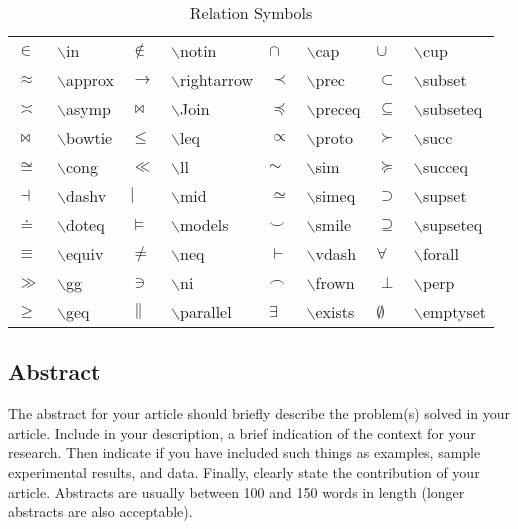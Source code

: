 \documentclass{llncs}
\begin{document}
\vspace{-10mm}

\begin{table}
\begin{center}
\caption{\label{relation}Relation Symbols}
\renewcommand{\arraystretch}{0.5}
\setlength\tabcolsep{3pt}
\begin{tabular}{llllllll}
\hline\noalign{\smallskip}
$\in$ & $\backslash$in & $\notin$ & $\backslash$notin & $\cap$ & $\backslash$cap & $\cup$ & $\backslash$cup\\
$\approx$ & $\backslash$approx & $\rightarrow$ & $\backslash$rightarrow & $\prec$ & $\backslash$prec & $\subset$& $\backslash$subset\\
$\asymp$ & $\backslash$asymp & $\Join$ & $\backslash$Join & $\preceq$ & $\backslash$preceq & $\subseteq$& $\backslash$subseteq\\
$\bowtie$ & $\backslash$bowtie & $\leq$ & $\backslash$leq & $\propto$ & $\backslash$proto & $\succ$& $\backslash$succ\\
$\cong$ & $\backslash$cong & $\ll$ & $\backslash$ll & $\sim$ & $\backslash$sim & $\succeq$& $\backslash$succeq\\
$\dashv$ & $\backslash$dashv & $\mid$ & $\backslash$mid & $\simeq$ & $\backslash$simeq & $\supset$& $\backslash$supset\\
$\doteq$ & $\backslash$doteq & $\models$ & $\backslash$models & $\smile$ & $\backslash$smile & $\supseteq$& $\backslash$supseteq\\
$\equiv$ & $\backslash$equiv & $\neq$ & $\backslash$neq & $\vdash$ & $\backslash$vdash & $\forall$ & $\backslash$forall\\
$\gg$ & $\backslash$gg & $\ni$ & $\backslash$ni  & $\frown$ & $\backslash$frown & $\perp$ & $\backslash$perp\\
$\geq$ & $\backslash$geq & $\parallel$ & $\backslash$parallel & $\exists$ &$\backslash$exists & $\emptyset$ & $\backslash$emptyset\\
\hline
\end{tabular}
\end{center}
\end{table}

\vspace{-8mm}

\subsection{Abstract}
The abstract for your article should briefly describe the problem(s) solved in your article.  Include in your description, a brief indication of the context for your research.  Then indicate if you have included such things as examples, sample experimental results, and data.  Finally, clearly state the contribution of your article.  Abstracts are usually between 100 and 150 words in length (longer abstracts are also acceptable).
\end{document}
